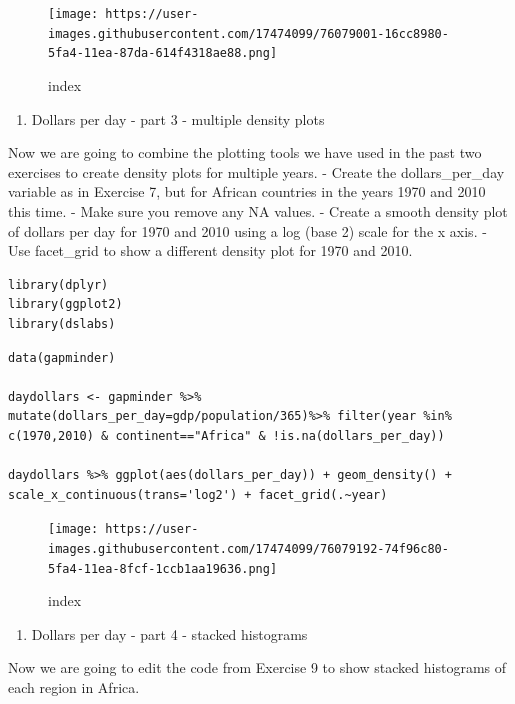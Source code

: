 \documentclass[
]{article}
\providecommand{\tightlist}{%
  \setlength{\itemsep}{0pt}\setlength{\parskip}{0pt}}
\begin{document}
\begin{figure}
\centering
\texttt{[image: https://user-images.githubusercontent.com/17474099/76079001-16cc8980-5fa4-11ea-87da-614f4318ae88.png]}
\caption{index}
\end{figure}

\begin{enumerate}
\def\labelenumi{\arabic{enumi}.}
\setcounter{enumi}{8}
\tightlist
\item
  Dollars per day - part 3 - multiple density plots
\end{enumerate}

Now we are going to combine the plotting tools we have used in the past
two exercises to create density plots for multiple years. - Create the
dollars\_per\_day variable as in Exercise 7, but for African countries
in the years 1970 and 2010 this time. - Make sure you remove any NA
values. - Create a smooth density plot of dollars per day for 1970 and
2010 using a log (base 2) scale for the x axis. - Use facet\_grid to
show a different density plot for 1970 and 2010.

\begin{verbatim}
library(dplyr)
library(ggplot2)
library(dslabs)
\end{verbatim}

\begin{verbatim}
data(gapminder)

daydollars <- gapminder %>% mutate(dollars_per_day=gdp/population/365)%>% filter(year %in% c(1970,2010) & continent=="Africa" & !is.na(dollars_per_day))

daydollars %>% ggplot(aes(dollars_per_day)) + geom_density() + scale_x_continuous(trans='log2') + facet_grid(.~year)
\end{verbatim}

\begin{figure}
\centering
\texttt{[image: https://user-images.githubusercontent.com/17474099/76079192-74f96c80-5fa4-11ea-8fcf-1ccb1aa19636.png]}
\caption{index}
\end{figure}

\begin{enumerate}
\def\labelenumi{\arabic{enumi}.}
\setcounter{enumi}{9}
\tightlist
\item
  Dollars per day - part 4 - stacked histograms
\end{enumerate}

Now we are going to edit the code from Exercise 9 to show stacked
histograms of each region in Africa.
\end{document}
